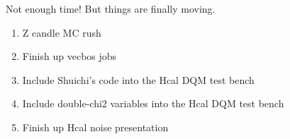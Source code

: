 Not enough time!  But things are finally moving.




\begin{enumerate}
\item Z candle MC rush
\item Finish up vecbos jobs
\item Include Shuichi's code into the Hcal DQM test bench
\item Include double-chi2 variables into the Hcal DQM test bench
\item Finish up Hcal noise presentation
\end{enumerate}



